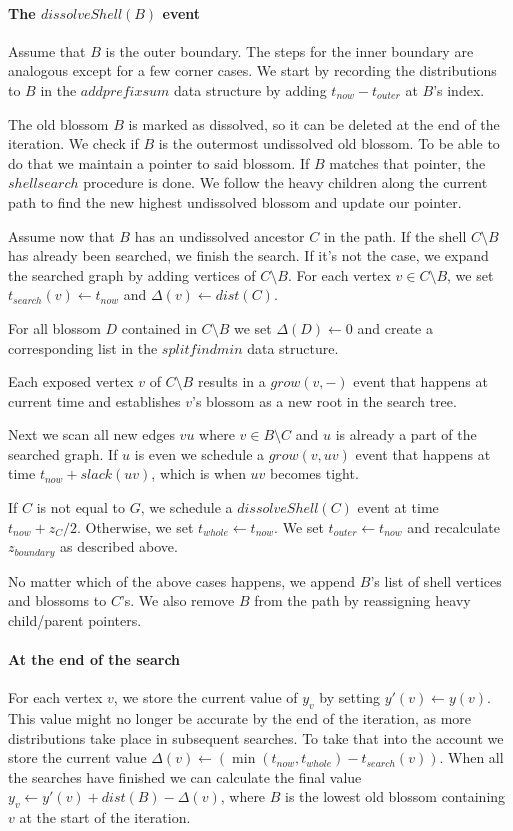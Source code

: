 \paragraph*{The $dissolveShell(B)$ event}

Assume that $B$ is the outer boundary. The steps for the inner boundary are analogous except for a few corner cases. We start by recording the distributions to $B$ in the $addprefixsum$ data structure by adding $t_{now} - t_{outer}$ at $B$'s index.

The old blossom $B$ is marked as dissolved, so it can be deleted at the end of the iteration. We check if $B$ is the outermost undissolved old blossom. To be able to do that we maintain a pointer to said blossom. If $B$ matches that pointer, the $shellsearch$ procedure is done. We follow the heavy children along the current path to find the new highest undissolved blossom and update our pointer.

Assume now that $B$ has an undissolved ancestor $C$ in the path. If the shell $C \setminus B$ has already been searched, we finish the search. If it's not the case, we expand the searched graph by adding vertices of $C \setminus B$. For each vertex $v \in C \setminus B$, we set $t_{search}(v) \gets t_{now}$ and $\Delta(v) \gets dist(C)$.

For all blossom $D$ contained in $C \setminus B$ we set $\Delta(D) \gets 0$ and create a corresponding list in the $splitfindmin$ data structure.

Each exposed vertex $v$ of $C \setminus B$ results in a $grow(v, -)$ event that happens at current time and establishes $v$'s blossom as a new root in the search tree.

Next we scan all new edges $vu$ where $v \in B \setminus C$ and $u$ is already a part of the  searched graph. If $u$ is even we schedule a $grow(v, uv)$ event that happens at time $t_{now} + slack(uv)$, which is when $uv$ becomes tight. 

If $C$ is not equal to $G$, we schedule a $dissolveShell(C)$ event at time $t_{now} + z_C / 2$. Otherwise, we set $t_{whole} \gets t_{now}$. We set $t_{outer} \gets t_{now}$ and recalculate $z_{boundary}$ as described above.

No matter which of the above cases happens, we append $B$'s list of shell vertices and blossoms to $C$'s. We also remove $B$ from the path by reassigning heavy child/parent pointers.

\paragraph*{At the end of the search} For each vertex $v$, we store the current value of $y_v$ by setting $y'(v) \gets y(v)$. This value might no longer be accurate by the end of the iteration, as more distributions take place in subsequent searches. To take that into the account we store the current value $\Delta(v) \gets (\min(t_{now}, t_{whole}) - t_{search}(v))$. When all the searches have finished we can calculate the final value $y_v \gets y'(v) + dist(B) - \Delta(v)$, where $B$ is the lowest old blossom containing $v$ at the start of the iteration.


